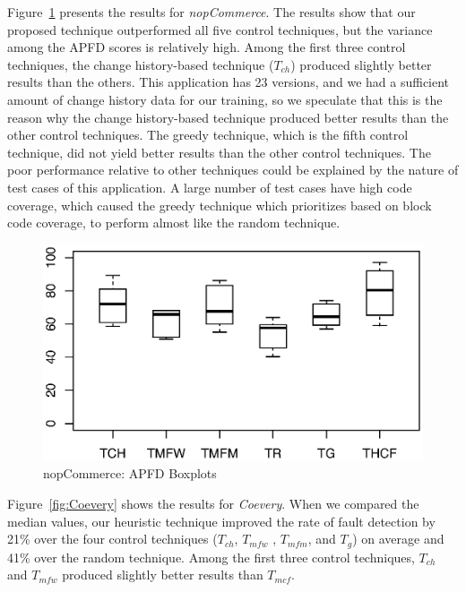 Figure~\ref{fig:nopCommerce} presents the results for {\em nopCommerce}.
The results show that our proposed technique outperformed  
all five control techniques, but the variance among the APFD scores is relatively high. 
Among the first three control techniques, the change history-based 
technique ($T_{ch}$) produced slightly better results than the others.
This application has 23 versions, and we had a sufficient
amount of change history data for our training, so we speculate that
this is the reason why the change history-based technique produced 
better results than the other control techniques. 
The greedy technique, which is the fifth control technique, did not yield 
better results than the other control techniques. 
The poor performance relative to other techniques could be explained by 
the nature of test cases of this application. A large number of test cases
have high code coverage, which caused the greedy technique which prioritizes based on 
block code coverage, to perform almost like the random technique.
 
\begin{figure}[!ht]
	\vspace*{-10pt}
	\centering
	\includegraphics[width=0.90\linewidth]{./nopWG2updated.eps}
	\vspace*{-3pt}
	\caption{nopCommerce: APFD Boxplots}
	\label{fig:nopCommerce}
\end{figure}

Figure~\ref{fig:Coevery} shows the results for {\em Coevery}. 
When we compared the median values, our heuristic technique improved
the rate of fault detection by 21\% over the four control techniques
($T_{ch}$, $T_{mfw}$ , $T_{mfm}$, and $T_{g}$) 
on average and 41\% over the random technique. 
Among the first three control techniques, $T_{ch}$ and $T_{mfw}$ 
produced slightly better results than $T_{mcf}$.

